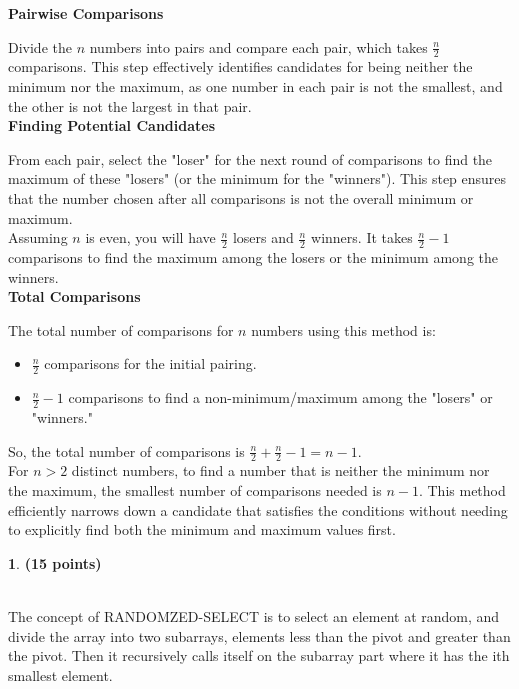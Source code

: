 \documentclass[11pt]{article}
\theoremstyle{definition}
\newtheorem{prob}{}
\newcommand{\solution}{\medskip\noindent{\color{DarkBlue}\textbf{Solution:}}}
\begin{document}
\textbf{Pairwise Comparisons}

Divide the \(n\) numbers into pairs and compare each pair, which takes \(\frac{n}{2}\) comparisons. This step effectively identifies candidates for being neither the minimum nor the maximum, as one number in each pair is not the smallest, and the other is not the largest in that pair. \\

\textbf{Finding Potential Candidates}

From each pair, select the "loser" for the next round of comparisons to find the maximum of these "losers" (or the minimum for the "winners"). This step ensures that the number chosen after all comparisons is not the overall minimum or maximum. \\

Assuming \(n\) is even, you will have \(\frac{n}{2}\) losers and \(\frac{n}{2}\) winners. It takes \(\frac{n}{2} - 1\) comparisons to find the maximum among the losers or the minimum among the winners.\\

\textbf{Total Comparisons}

The total number of comparisons for \(n\) numbers using this method is:
\begin{itemize}
    \item \(\frac{n}{2}\) comparisons for the initial pairing.
    \item \(\frac{n}{2} - 1\) comparisons to find a non-minimum/maximum among the "losers" or "winners."
\end{itemize}
So, the total number of comparisons is \(\frac{n}{2} + \frac{n}{2} - 1 = n - 1\).\\

For \(n > 2\) distinct numbers, to find a number that is neither the minimum nor the maximum, the smallest number of comparisons needed is \(n - 1\). This method efficiently narrows down a candidate that satisfies the conditions without needing to explicitly find both the minimum and maximum values first. \\

\begin{prob} \textbf{(15 points)}
\end{prob}

\solution \\

The concept of RANDOMZED-SELECT is to select an element at random, and divide the array into two subarrays, elements less than the pivot and greater than the pivot.
Then it recursively calls itself on the subarray part where it has the ith smallest element. \\
\end{document}
